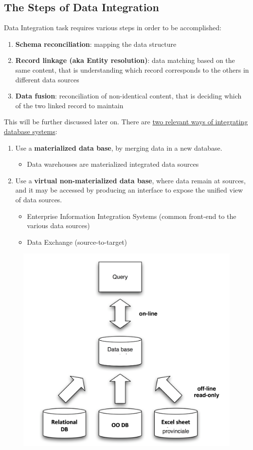 \documentclass[10pt,a4paper]{article}
\begin{document}
\subsection{The Steps of Data Integration}
\begin{justify}
Data Integration task requires various steps in order to be accomplished:
\begin{enumerate}
	\item \textbf{Schema reconciliation}: mapping the data structure
	\item \textbf{Record linkage (aka Entity resolution)}: data matching based on the same content, that is understanding which record corresponds to the others in different data sources
	\item \textbf{Data fusion}: reconciliation of non-identical content, that is deciding which of the two linked record to maintain
\end{enumerate}
This will be further discussed later on.
There are \uline{two relevant ways of integrating database systems}:
\begin{enumerate}
	\item Use a \textbf{materialized data base}, by merging data in a new database.
	\begin{itemize}
		\item Data warehouses are materialized integrated data sources
	\end{itemize}
	\item Use a \textbf{virtual non-materialized data base}, where data remain at sources, and it may be accessed by producing an interface to expose the unified view of data sources.
	\begin{itemize}
		\item Enterprise Information Integration Systems (common front-end to the various data sources)
		\item Data Exchange (source-to-target)
	\end{itemize}
\end{enumerate}
\begin{figure}[htp]
\centering
\includegraphics[width=.4\textwidth]{images/materialized-integration}\hfill

\end{figure}
\end{justify}
\end{document}
